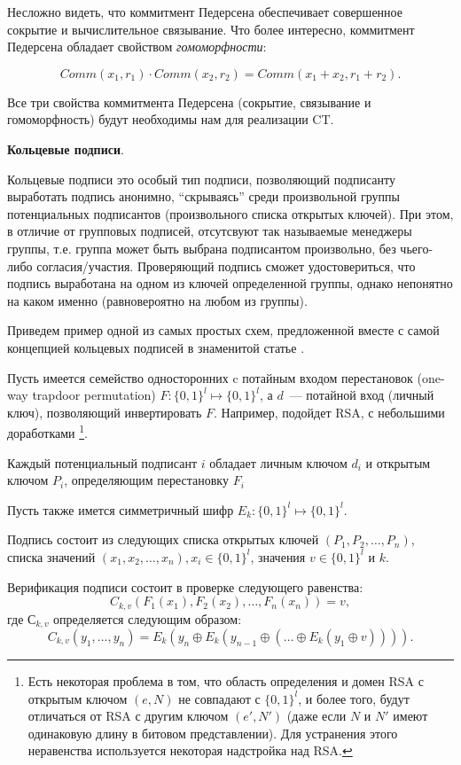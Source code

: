 \documentclass{article}
\begin{document}
 Несложно видеть, что коммитмент Педерсена обеспечивает совершенное сокрытие и вычислительное связывание.
 Что более интересно, коммитмент Педерсена обладает свойством \textit{гомоморфности}:

 $$
 Comm(x_1, r_1) \cdot Comm(x_2, r_2) = Comm(x_1 + x_2, r_1 + r_2).
 $$

Все три свойства коммитмента Педерсена (сокрытие, связывание и гомоморфность)
будут необходимы нам для реализации CT.

{\bf Кольцевые подписи}.

Кольцевые подписи это особый тип подписи,
позволяющий подписанту выработать подпись анонимно,
``скрываясь'' среди произвольной группы потенциальных подписантов (произвольного списка открытых ключей).
При этом, в отличие от групповых подписей,
отсутсвуют так называемые менеджеры группы,
т.е. группа может быть выбрана подписантом произвольно,
без чьего-либо согласия/участия. Проверяющий подпись сможет удостовериться,
что подпись выработана на одном из ключей определенной группы,
однако непонятно на каком именно (равновероятно на любом из группы).

Приведем пример одной из самых простых схем,
предложенной вместе с самой концепцией кольцевых подписей в знаменитой статье \cite{ringSig}.

Пусть имеется семейство односторонних c потайным входом перестановок (one-way trapdoor permutation)
$F: \{0,1\}^l \mapsto \{0,1\}^l$, а $d$~--- потайной вход (личный ключ),
позволяющий инвертировать $F$.
Например, подойдет RSA, с небольшими доработками
\footnote{Есть некоторая проблема в том,
что область определения и домен RSA с открытым ключом $(e, N)$ не совпадают с $\{0,1\}^l$,
и более того, будут отличаться от RSA с другим ключом $(e', N')$
(даже если $N$ и $N'$ имеют одинаковую длину в битовом представлении).
Для устранения этого неравенства используется некоторая надстройка над RSA.}.

Каждый потенциальный подписант $i$ обладает личным ключом $d_i$ и открытым ключом $P_i$,
определяющим перестановку $F_i$

Пусть также имется симметричный шифр $E_k: \{0,1\}^l \mapsto \{0,1\}^l$.

Подпись состоит из следующих списка открытых ключей $(P_1, P_2, \ldots, P_{n})$,
списка значений $(x_1, x_2, \ldots, x_{n}), x_i\in \{0,1\}^l$,
значения $v\in \{0,1\}^l$ и $k$.

Верификация подписи состоит в проверке следующего равенства:
$$
C_{k, v} (F_1(x_1), F_2(x_2), \ldots, F_n(x_n)) = v,
$$
где $С_{k, v}$ определяется следующим образом:
$$
C_{k,v}(y_1, \ldots, y_n) = E_k(y_n \oplus E_k(y_{n-1} \oplus (\ldots \oplus E_k(y_1 \oplus v)))).
$$
\end{document}
